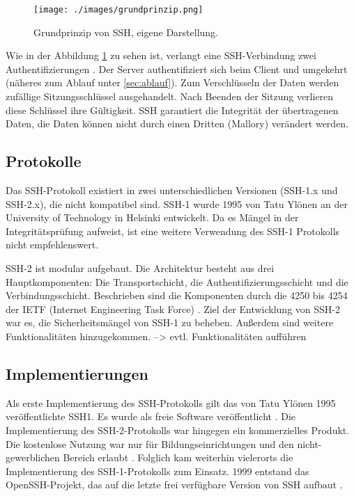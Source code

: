 \documentclass[ngerman,pdf]{wkcms}    %
\begin{document}
\begin{figure}[!h] 
\centering 
\texttt{[image: ./images/grundprinzip.png]}
\label{fig:abb1} 
\caption[Abbildung 1]{Grundprinzip von SSH, eigene Darstellung.} 
\end{figure}
 
Wie in der Abbildung \ref{fig:abb1} zu sehen ist, verlangt eine SSH-Verbindung zwei Authentifizierungen \cite[S. 47]{SSH}. Der Server authentifiziert sich beim Client und umgekehrt (näheres zum Ablauf unter \ref{sec:ablauf}). Zum Verschlüsseln der Daten werden zufällige Sitzungsschlüssel ausgehandelt. Nach Beenden der Sitzung verlieren diese Schlüssel ihre Gültigkeit. SSH garantiert die Integrität der übertragenen Daten, \Dh die Daten können nicht durch einen Dritten (Mallory) verändert werden. 


\subsection{Protokolle}

Das SSH-Protokoll existiert in zwei unterschiedlichen Versionen (SSH-1.x und SSH-2.x), die nicht kompatibel sind. SSH-1 wurde 1995 von Tatu Ylönen an der University of Technology in Helsinki entwickelt. Da es Mängel in der Integritätsprüfung aufweist, ist eine weitere Verwendung des SSH-1 Protokolls nicht empfehlenswert.

SSH-2 ist modular aufgebaut. Die Architektur besteht aus drei Hauptkomponenten: Die Transportschicht, die Authentifizierungsschicht und die Verbindungsschicht. Beschrieben sind die Komponenten durch die  4250 bis 4254 der IETF (Internet Engineering Task Force) \cite{ietf}. Ziel der Entwicklung von SSH-2 war es, die Sicherheitsmängel von SSH-1 zu beheben. Außerdem sind weitere Funktionalitäten hinzugekommen. --> evtl. Funktionalitäten aufführen


\subsection{Implementierungen}

Als erste Implementierung des SSH-Protokolls gilt das von Tatu Ylönen 1995 veröffentlichte SSH1.
Es wurde als freie Software veröffentlicht \cite[S. 11]{SSH}. Die Implementierung des SSH-2-Protokolls war hingegen ein kommerzielles Produkt. Die kostenlose Nutzung war nur für Bildungseinrichtungen und den nicht-gewerblichen Bereich erlaubt \cite[S. 22]{SSH}. Folglich kam weiterhin vielerorts die Implementierung des SSH-1-Protokolls zum Einsatz. 1999 entstand das OpenSSH-Projekt, das auf die letzte frei verfügbare Version von SSH aufbaut \cite{OpenSSH}.
\end{document}
